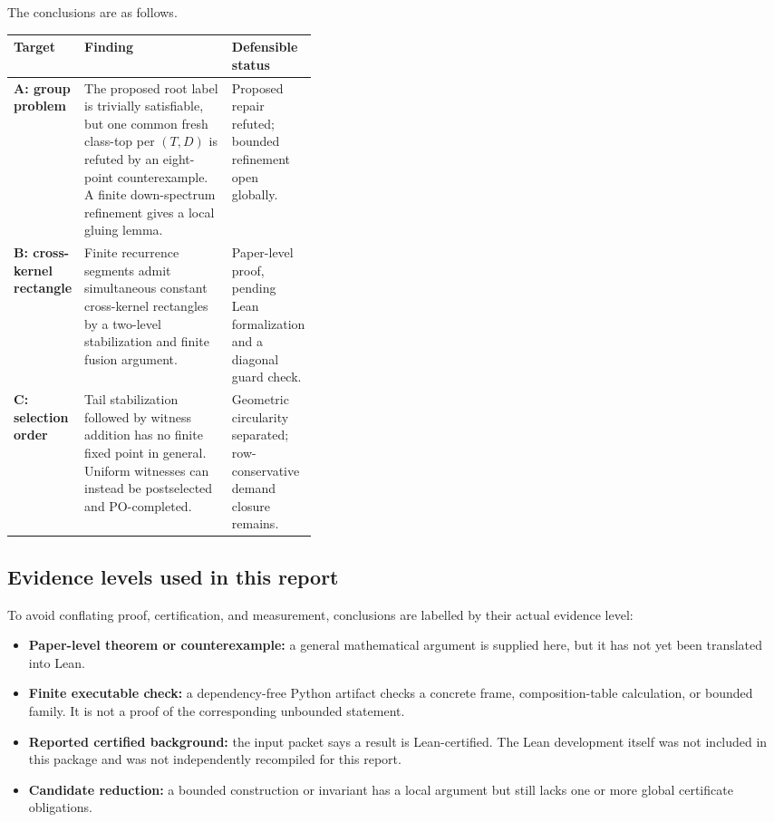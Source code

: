 \documentclass[11pt]{article}
\begin{document}
The conclusions are as follows.

\begin{center}
\renewcommand{\arraystretch}{1.28}
\begin{tabularx}{\linewidth}{>{\bfseries}p{0.16\linewidth}X>{\raggedright\arraybackslash}p{0.23\linewidth}}
\toprule
Target & Finding & Defensible status \\
\midrule
A: group problem & The proposed root label is trivially satisfiable, but one common
fresh class-top per $(T,D)$ is refuted by an eight-point counterexample. A finite
down-spectrum refinement gives a local gluing lemma. & Proposed repair refuted;
bounded refinement open globally. \\
B: cross-kernel rectangle & Finite recurrence segments admit simultaneous constant
cross-kernel rectangles by a two-level stabilization and finite fusion argument. &
Paper-level proof, pending Lean formalization and a diagonal guard check. \\
C: selection order & Tail stabilization followed by witness addition has no finite fixed
point in general. Uniform witnesses can instead be postselected and PO-completed. &
Geometric circularity separated; row-conservative demand closure remains. \\
\bottomrule
\end{tabularx}
\end{center}

\subsection{Evidence levels used in this report}

To avoid conflating proof, certification, and measurement, conclusions are labelled by
their actual evidence level:

\begin{itemize}
  \item \textbf{Paper-level theorem or counterexample:} a general mathematical argument is
        supplied here, but it has not yet been translated into Lean.
  \item \textbf{Finite executable check:} a dependency-free Python artifact checks a
        concrete frame, composition-table calculation, or bounded family. It is not a
        proof of the corresponding unbounded statement.
  \item \textbf{Reported certified background:} the input packet says a result is
        Lean-certified. The Lean development itself was not included in this package and
        was not independently recompiled for this report.
  \item \textbf{Candidate reduction:} a bounded construction or invariant has a local
        argument but still lacks one or more global certificate obligations.
\end{itemize}
\end{document}
